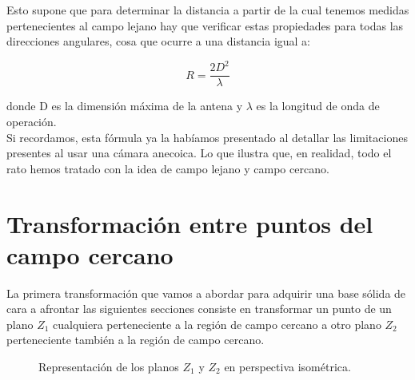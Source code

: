 Esto supone que para determinar la distancia a partir de la cual tenemos medidas pertenecientes al campo lejano hay que verificar estas propiedades para todas las direcciones angulares, cosa que ocurre a una distancia igual a:

\begin{equation}
                            R =\frac{2D^2}{\lambda}
\end{equation}

\noindent
donde D es la dimensión máxima de la antena y $\lambda$ es la longitud de onda de operación.\\

Si recordamos, esta fórmula ya la habíamos presentado al detallar las limitaciones presentes al usar una cámara anecoica. Lo que ilustra que, en realidad, todo el rato hemos tratado con la idea de campo lejano y campo cercano.
\newpage

\section{Transformación entre puntos del campo cercano}

La primera transformación que vamos a abordar para adquirir una base sólida de cara a afrontar las siguientes secciones consiste en transformar un punto de un plano $Z_1$ cualquiera perteneciente a la región de campo cercano a otro plano $Z_2$ perteneciente también a la región de campo cercano.

\begin{figure}[htbp]
  \centering
  \caption{Representación de los planos \( Z_1 \) y \( Z_2 \) en perspectiva isométrica.}
  \label{fig:planos_NF_Z1_Z_2}
\end{figure}


